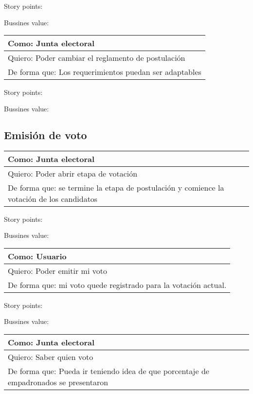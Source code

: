 \medskip
Story points:

\medskip
Bussines value:


\bigskip

\begin{tabular}{|l|}
\hline
Como: Junta electoral\\
\hline
Quiero: Poder cambiar el reglamento de postulaci\'on\\
\hline
De forma que: Los requerimientos puedan ser adaptables \\
\hline
\end{tabular}

\medskip
Story points:

\medskip
Bussines value:


\bigskip

\subsection{Emisi\'on de voto}


\begin{tabular}{|l|}
\hline
Como: Junta electoral\\
\hline
Quiero: Poder abrir etapa de votaci\'on\\
\hline
De forma que: se termine la etapa de postulaci\'on y comience la votaci\'on de los candidatos\\
\hline
\end{tabular}

\medskip
Story points:

\medskip
Bussines value:

\bigskip

\begin{tabular}{|l|}
\hline
Como: Usuario\\
\hline
Quiero: Poder emitir mi voto\\
\hline
De forma que: mi voto quede registrado para la votaci\'on actual.\\
\hline
\end{tabular}

\medskip
Story points:

\medskip
Bussines value:


\bigskip

\begin{tabular}{|l|}
\hline
Como: Junta electoral\\
\hline
Quiero: Saber quien voto\\
\hline
De forma que: Pueda ir teniendo idea de que porcentaje de empadronados se presentaron\\
\hline
\end{tabular}

